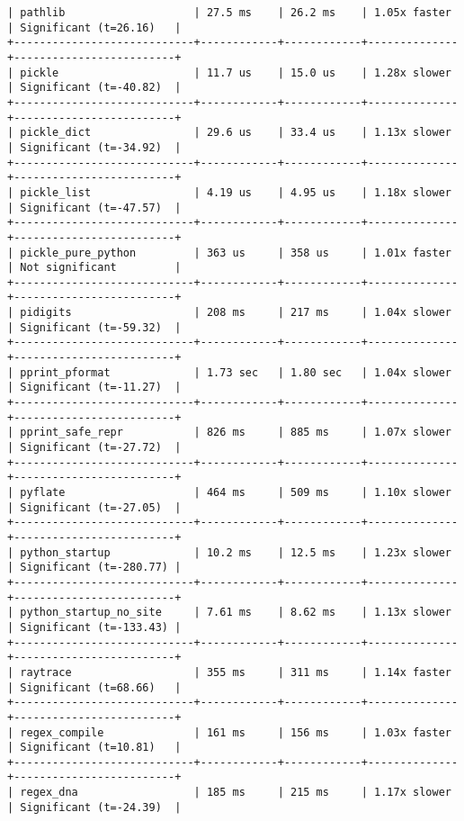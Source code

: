 \begin{code}
\begin{verbatim}
| pathlib                    | 27.5 ms    | 26.2 ms    | 1.05x faster | Significant (t=26.16)   |
+----------------------------+------------+------------+--------------+-------------------------+
| pickle                     | 11.7 us    | 15.0 us    | 1.28x slower | Significant (t=-40.82)  |
+----------------------------+------------+------------+--------------+-------------------------+
| pickle_dict                | 29.6 us    | 33.4 us    | 1.13x slower | Significant (t=-34.92)  |
+----------------------------+------------+------------+--------------+-------------------------+
| pickle_list                | 4.19 us    | 4.95 us    | 1.18x slower | Significant (t=-47.57)  |
+----------------------------+------------+------------+--------------+-------------------------+
| pickle_pure_python         | 363 us     | 358 us     | 1.01x faster | Not significant         |
+----------------------------+------------+------------+--------------+-------------------------+
| pidigits                   | 208 ms     | 217 ms     | 1.04x slower | Significant (t=-59.32)  |
+----------------------------+------------+------------+--------------+-------------------------+
| pprint_pformat             | 1.73 sec   | 1.80 sec   | 1.04x slower | Significant (t=-11.27)  |
+----------------------------+------------+------------+--------------+-------------------------+
| pprint_safe_repr           | 826 ms     | 885 ms     | 1.07x slower | Significant (t=-27.72)  |
+----------------------------+------------+------------+--------------+-------------------------+
| pyflate                    | 464 ms     | 509 ms     | 1.10x slower | Significant (t=-27.05)  |
+----------------------------+------------+------------+--------------+-------------------------+
| python_startup             | 10.2 ms    | 12.5 ms    | 1.23x slower | Significant (t=-280.77) |
+----------------------------+------------+------------+--------------+-------------------------+
| python_startup_no_site     | 7.61 ms    | 8.62 ms    | 1.13x slower | Significant (t=-133.43) |
+----------------------------+------------+------------+--------------+-------------------------+
| raytrace                   | 355 ms     | 311 ms     | 1.14x faster | Significant (t=68.66)   |
+----------------------------+------------+------------+--------------+-------------------------+
| regex_compile              | 161 ms     | 156 ms     | 1.03x faster | Significant (t=10.81)   |
+----------------------------+------------+------------+--------------+-------------------------+
| regex_dna                  | 185 ms     | 215 ms     | 1.17x slower | Significant (t=-24.39)  |

\end{verbatim}
\end{code}
